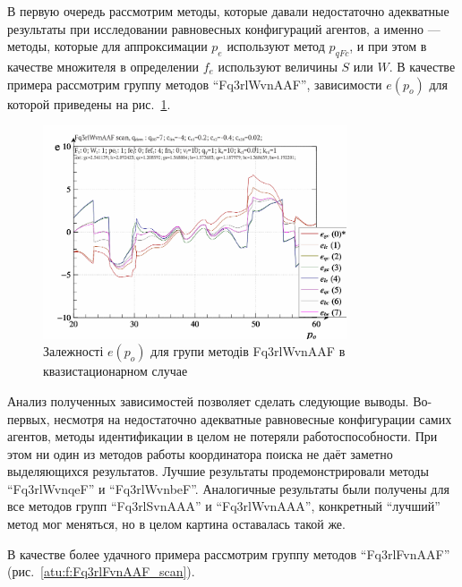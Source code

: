 В первую очередь рассмотрим методы, которые давали
недостаточно адекватные результаты при
исследовании равновесных конфигураций агентов, а именно ---
методы, которые для аппроксимации $p_e$
используют метод $p_{qFc}$, и при этом в качестве
множителя в определении $f_e$ используют величины $S$ или $W$.
В качестве примера рассмотрим группу методов ``Fq3rlWvnAAF'',
зависимости $e(p_o)$ для которой приведены на рис.~\ref{atu:f:Fq3rlWvnAAF_scan}.

\begin{figure}[htb!]
  \begin{center}
    \includegraphics[width=0.8\textwidth]{p/scan/qls-p_p_e_Fq3rlWvnAAF_scan.png}
  \end{center}
  \caption{Залежності $e(p_o)$ для групи методів Fq3rlWvnAAF в квазистационарном случае}
  \label{atu:f:Fq3rlWvnAAF_scan}
\end{figure}

Анализ полученных зависимостей позволяет сделать следующие выводы.
Во-первых, несмотря на недостаточно адекватные равновесные конфигурации
самих агентов, методы идентификации в целом не потеряли работоспособности.
При этом ни один из методов работы координатора поиска
не даёт заметно выделяющихся результатов.
Лучшие результаты продемонстрировали методы
``Fq3rlWvnqeF'' и ``Fq3rlWvnbeF''.
Аналогичные результаты были получены для все методов групп
``Fq3rlSvnAAA'' и ``Fq3rlWvnAAA'', конкретный ``лучший'' метод
мог меняться, но в целом картина оставалась такой же.

В качестве более удачного примера рассмотрим
группу методов ``Fq3rlFvnAAF'' (рис.~\ref{atu:f:Fq3rlFvnAAF_scan}).

